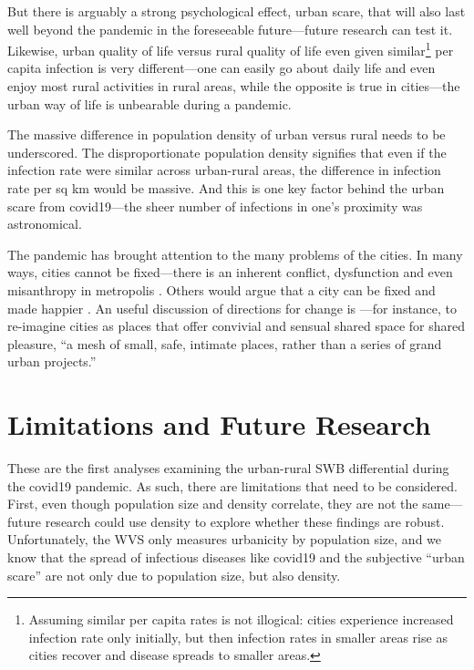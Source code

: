 \documentclass[10pt, letterpaper]{article}
\begin{document}
\begin{spacing}{1.4}
But there is arguably a strong psychological effect, urban scare, that will also last well beyond the pandemic in the foreseeable future---future research can test it. Likewise, urban quality of life versus rural quality of life even given
similar\footnote{Assuming similar per capita rates is not illogical: cities experience increased infection rate only initially, but then infection
  rates in smaller areas rise as cities recover and disease
  spreads to smaller areas.} per capita infection is very different---one can easily go about daily life and even enjoy most rural activities in rural areas, while the opposite is true in cities---the urban way of life is unbearable during a pandemic.


The massive difference in population density of urban versus rural needs to be
underscored. The disproportionate population density signifies that even if the infection rate were similar across urban-rural areas, the difference in infection rate per sq km would be
massive. And this is one key factor behind the urban scare from covid19---the sheer number of
infections in one's proximity was astronomical.

The pandemic has brought attention to the many problems of the cities. 
In many ways, cities cannot be fixed---there is an inherent conflict, dysfunction
and even misanthropy in metropolis \citep{wirth38,fischer72,aok22,thrift05,amin06,aokCityBook15,peck16}. 
Others would argue that a city can be fixed and made happier \citep[for a review
see][]{ballas13}. An useful discussion of directions for change is \citet{olasov22}---for
instance, to re-imagine cities as places that offer convivial and sensual shared space for shared pleasure, ``a mesh of small, safe, intimate places, rather than a series of grand urban projects.''


\section{Limitations and Future Research}

These are the first  analyses examining the urban-rural SWB differential during the covid19 pandemic. As such, there are limitations that need to be considered. First, even though population size and density correlate, they are not the same---future research
could use density to explore whether these findings are robust. Unfortunately, the WVS only measures urbanicity by population size, and we know that the spread of infectious diseases like covid19 and the subjective ``urban scare'' are not only due to population size, but also density. 


\end{spacing}
\end{document}
